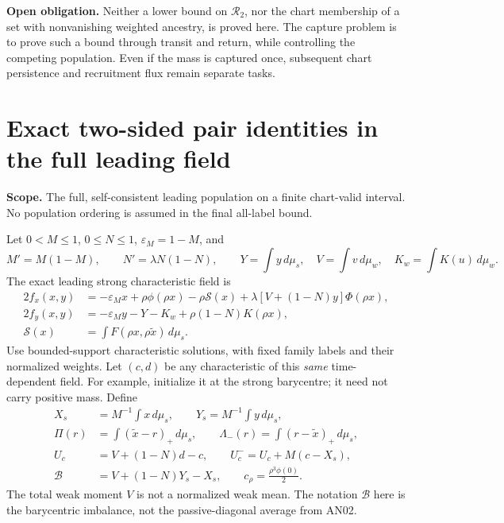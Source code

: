\documentclass[11pt]{article}
\numberwithin{equation}{section}
\theoremstyle{remark}\newtheorem{remark}[theorem]{Remark}
\newcommand{\dd}{\,d}
\newcommand{\1}{\mathbf 1}
\newcommand{\scope}[1]{\par\noindent\textbf{Scope.} #1\par\smallskip}
\newcommand{\gap}[1]{\par\noindent\textbf{Open obligation.} #1\par\smallskip}
\begin{document}
\gap{Neither a lower bound on $\mathcal R_2$, nor the chart membership
of a set with nonvanishing weighted ancestry, is proved here. The capture
problem is to prove such a bound through transit and return, while
controlling the competing population. Even if the mass is captured once,
subsequent chart persistence and recruitment flux remain separate tasks.}

\section{Exact two-sided pair identities in the full leading field}
\label{inc:AN03:ret:v1:two-sided}
\scope{The full, self-consistent leading population on a finite
chart-valid interval. No population ordering is assumed in the final
all-label bound.}
Let $0<M\le1$, $0\le N\le1$, $\varepsilon_M=1-M$, and
\[
 M'=M(1-M),\qquad N'=\lambda N(1-N),\qquad
 Y=\int y\dd\mu_s,\quad V=\int v\dd\mu_w,\quad K_w=\int K(u)\dd\mu_w.
\]
The exact leading strong characteristic field is
\begin{align}
 2f_x(x,y)&=-\varepsilon_Mx+\rho\phi(\rho x)-\rho\mathcal S(x)
 +\lambda[V+(1-N)y]\Phi(\rho x),\label{inc:AN03:ret:v1:field}\\
 2f_y(x,y)&=-\varepsilon_My-Y-K_w+\rho(1-N)K(\rho x),\nonumber\\
 \mathcal S(x)&=\int F(\rho x,\rho\widetilde x)\dd\mu_s.
 \nonumber
\end{align}
Use bounded-support characteristic solutions, with fixed family labels
and their normalized weights. Let $(c,d)$ be any characteristic of this
\emph{same} time-dependent field. For example, initialize it at the strong
barycentre; it need not carry positive mass. Define
\begin{align}
 X_s&=M^{-1}\int x\dd\mu_s,\qquad Y_s=M^{-1}\int y\dd\mu_s,\nonumber\\
 \Pi(r)&=\int(\widetilde x-r)_+\dd\mu_s,\qquad
 \Lambda_-(r)=\int(r-\widetilde x)_+\dd\mu_s,\nonumber\\
 U_c&=V+(1-N)d-c,\qquad U_c^-=U_c+M(c-X_s),\nonumber\\
 \mathcal B&=V+(1-N)Y_s-X_s,\qquad
 c_\rho=\frac{\rho^3\phi(0)}2.
 \label{inc:AN03:ret:v1:budgets}
\end{align}
The total weak moment $V$ is not a normalized weak mean. The notation
$\mathcal B$ here is the barycentric imbalance, not the passive-diagonal
average from AN02.
\end{document}
